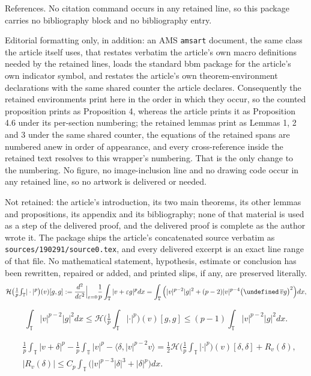 \documentclass[10pt,a4paper]{amsart}
\theoremstyle{plain}
\theoremstyle{definition}
\theoremstyle{remark}
\newcommand{\T}{\mathbb{T}}
\newcommand{\dl}{\delta}
\newcommand{\ep}{\varepsilon}
\newcommand{\cj}{\overline}
\newcommand{\eps}{\ep}
\let\Re=\undefined\DeclareMathOperator*{\Re}{Re}
\newcommand{\HF}[2]{\mathcal H\big(\tfrac1p{\textstyle\int_\T}|\cdot|^p\big)(#1)[#2]}
\begin{document}
References. No citation command occurs in any retained line, so this package carries no bibliography block and no bibliography entry.

Editorial formatting only, in addition: an AMS \texttt{amsart} document, the same class the article itself uses, that restates verbatim the article's own macro definitions needed by the retained lines, loads the standard bbm package for the article's own indicator symbol, and restates the article's own theorem-environment declarations with the same shared counter the article declares. Consequently the retained environments print here in the order in which they occur, so the counted proposition prints as Proposition 4, whereas the article prints it as Proposition 4.6 under its per-section numbering; the retained lemmas print as Lemmas 1, 2 and 3 under the same shared counter, the equations of the retained spans are numbered anew in order of appearance, and every cross-reference inside the retained text resolves to this wrapper's numbering. That is the only change to the numbering. No figure, no image-inclusion line and no drawing code occur in any retained line, so no artwork is delivered or needed.

Not retained: the article's introduction, its two main theorems, its other lemmas and propositions, its appendix and its bibliography; none of that material is used as a step of the delivered proof, and the delivered proof is complete as the author wrote it. The package ships the article's concatenated source verbatim as \texttt{sources/190291/source0.tex}, and every delivered excerpt is an exact line range of that file. No mathematical statement, hypothesis, estimate or conclusion has been rewritten, repaired or added, and printed slips, if any, are preserved literally.
\begin{equation}\label{s4:secvar}
\HF{v}{g,g}:=\frac{d^2}{d\eps^2}\Big|_{\eps=0}\frac1p\int_\T|v+\eps g|^pdx
=\int_\T\Big(|v|^{p-2}|g|^2+(p-2)|v|^{p-4}\big(\Re\,\cj vg\big)^2\Big)dx ,
\end{equation}

\begin{equation} \label{HintUB}
    \int_\T|v|^{p-2}|g|^2dx\le\HF{v}{g,g}\le(p-1)\int_\T|v|^{p-2}|g|^2dx .
\end{equation}

\begin{equation}\label{s4:Taylor}
\begin{aligned}
&\frac1p\int_\T|v+\dl|^p-\frac1p\int_\T|v|^p-\big\langle\dl,|v|^{p-2}v\big\rangle
=\frac12\HF{v}{\dl,\dl}+R_v(\dl),\\
&|R_v(\dl)|\le C_p\int_\T\big(|v|^{p-3}|\dl|^3+|\dl|^p\big)dx .
\end{aligned}
\end{equation}
\end{document}
